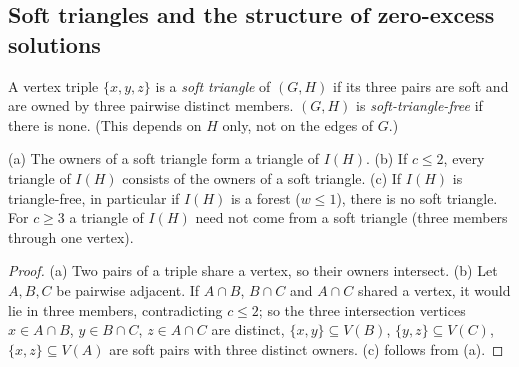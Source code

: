 \subsection{Soft triangles and the structure of zero-excess solutions}
\begin{definition}\label{def:softtri}
A vertex triple $\{x,y,z\}$ is a \emph{soft triangle} of $(G,H)$ if its three pairs are soft and are owned by three pairwise distinct members. $(G,H)$ is \emph{soft-triangle-free} if there is none. (This depends on $H$ only, not on the edges of $G$.)
\end{definition}
\begin{lemma}\label{lem:tri}
(a) The owners of a soft triangle form a triangle of $I(H)$. (b) If $c\le2$, every triangle of $I(H)$ consists of the owners of a soft triangle. (c) If $I(H)$ is triangle-free, in particular if $I(H)$ is a forest ($w\le1$), there is no soft triangle. For $c\ge3$ a triangle of $I(H)$ need not come from a soft triangle (three members through one vertex).
\end{lemma}
\begin{proof}
(a) Two pairs of a triple share a vertex, so their owners intersect. (b) Let $A,B,C$ be pairwise adjacent. If $A\cap B$, $B\cap C$ and $A\cap C$ shared a vertex, it would lie in three members, contradicting $c\le2$; so the three intersection vertices $x\in A\cap B$, $y\in B\cap C$, $z\in A\cap C$ are distinct, $\{x,y\}\subseteq V(B)$, $\{y,z\}\subseteq V(C)$, $\{x,z\}\subseteq V(A)$ are soft pairs with three distinct owners. (c) follows from (a).
\end{proof}

